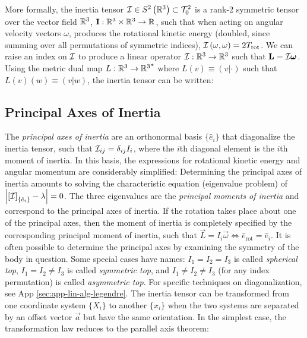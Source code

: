 More formally, the inertia tensor $\mathcal{I} \in S^2\left(\mathbb{R}^{3}\right) \subset \mathcal{T}^{2}_{0}$ is a rank-2 symmetric tensor over the vector field $\mathbb{R}^{3}$, $\boldsymbol{\mathbf{I}}: \mathbb{R}^{3} \times \mathbb{R}^{3} \rightarrow \mathbb{R}^{}$, such that when acting on angular velocity vectors $\omega$, produces the rotational kinetic energy (doubled, since summing over all permutations of symmetric indices), $\mathcal{I}\left(\omega, \omega\right) = 2T_{\text{rot}}$. We can raise an index on $\mathcal{I}$ to produce a linear operator $\mathcal{I}: \mathbb{R}^{3} \to \mathbb{R}^{3}$ such that $\boldsymbol{\mathbf{L}} = \mathcal{I}\boldsymbol{\mathbf{\omega}}$. Using the metric dual map $L: \mathbb{R}^{3} \to {\mathbb{R}^{3}}^*$ where $L(v) \equiv (v|\cdot)$ such that $L(v)(w)\equiv(v|w)$, the inertia tensor can be written:

\subsection{Principal Axes of Inertia}
The \textit{principal axes of inertia} are an orthonormal basis $\{\hat{e}_i\}$ that diagonalize the inertia tensor, such that $\mathcal{I}_{ij}=\delta_{ij}I_i$, where the $i$th diagonal element is the $i$th moment of inertia. In this basis, the expressions for rotational kinetic energy and angular momentum are considerably simplified:
Determining the principal axes of inertia amounts to solving the characteristic equation (eigenvalue problem) of $\left\lvert\left[\mathcal{I}\right]_{\{\hat{e}_i\}} - \lambda\right\rvert = 0$. The three eigenvalues are the \textit{principal moments of inertia} and correspond to the principal axes of inertia. If the rotation takes place about one of the principal axes, then the moment of inertia is completely specified by the corresponding principal moment of inertia, such that $\vec{L} = I_i\vec{\omega} \iff \hat{e}_{\text{rot}} = \hat{e}_i$. It is often possible to determine the principal axes by examining the symmetry of the body in question. Some special cases have names: $I_1 = I_2 = I_3$ is called \textit{spherical top}, $I_1 = I_2 \neq I_3$ is called \textit{symmetric top}, and $I_1 \neq I_2 \neq I_3$ (for any index permutation) is called \textit{asymmetric top}.
For specific techniques on diagonalization, see App \ref{sec:app-lin-alg-legendre}.
The inertia tensor can be transformed from one coordinate system $\{X_i\}$ to another $\{x_i\}$ when the two systems are separated by an offset vector $\vec{a}$ but have the same orientation. In the simplest case, the transformation law reduces to the parallel axis theorem:

